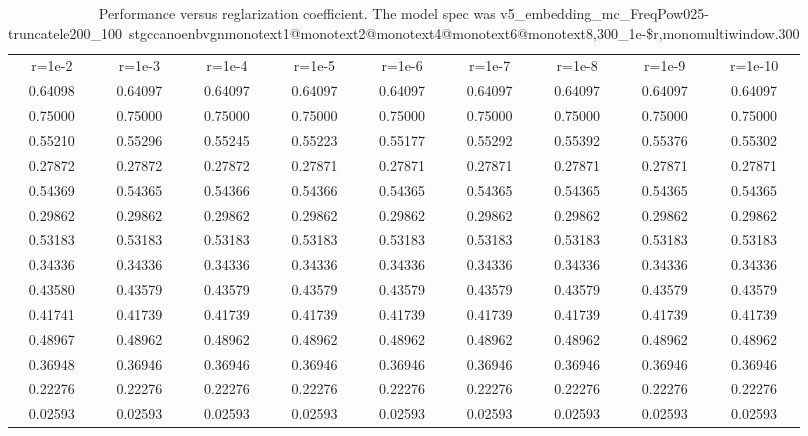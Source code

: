\documentclass[11pt]{article}
\begin{document}
\begin{table*}[htbp]
  \centering
  \begin{tabular}{ccccccccc}
    r=1e-2 & r=1e-3 & r=1e-4 & r=1e-5 & r=1e-6 & r=1e-7 & r=1e-8 & r=1e-9 & r=1e-10 \\
0.64098 & 0.64097 & 0.64097 & 0.64097 & 0.64097 & 0.64097 & 0.64097 & 0.64097 & 0.64097 \\
0.75000 & 0.75000 & 0.75000 & 0.75000 & 0.75000 & 0.75000 & 0.75000 & 0.75000 & 0.75000 \\
0.55210 & 0.55296 & 0.55245 & 0.55223 & 0.55177 & 0.55292 & 0.55392 & 0.55376 & 0.55302  \\
0.27872 & 0.27872 & 0.27872 & 0.27871 & 0.27871 & 0.27871 & 0.27871 & 0.27871 & 0.27871  \\
0.54369 & 0.54365 & 0.54366 & 0.54366 & 0.54365 & 0.54365 & 0.54365 & 0.54365 & 0.54365  \\
0.29862 & 0.29862 & 0.29862 & 0.29862 & 0.29862 & 0.29862 & 0.29862 & 0.29862 & 0.29862  \\
0.53183 & 0.53183 & 0.53183 & 0.53183 & 0.53183 & 0.53183 & 0.53183 & 0.53183 & 0.53183  \\
0.34336 & 0.34336 & 0.34336 & 0.34336 & 0.34336 & 0.34336 & 0.34336 & 0.34336 & 0.34336  \\
0.43580 & 0.43579 & 0.43579 & 0.43579 & 0.43579 & 0.43579 & 0.43579 & 0.43579 & 0.43579  \\
0.41741 & 0.41739 & 0.41739 & 0.41739 & 0.41739 & 0.41739 & 0.41739 & 0.41739 & 0.41739  \\
0.48967 & 0.48962 & 0.48962 & 0.48962 & 0.48962 & 0.48962 & 0.48962 & 0.48962 & 0.48962  \\
0.36948 & 0.36946 & 0.36946 & 0.36946 & 0.36946 & 0.36946 & 0.36946 & 0.36946 & 0.36946  \\
0.22276 & 0.22276 & 0.22276 & 0.22276 & 0.22276 & 0.22276 & 0.22276 & 0.22276 & 0.22276  \\
0.02593 & 0.02593 & 0.02593 & 0.02593 & 0.02593 & 0.02593 & 0.02593 & 0.02593 & 0.02593 \\
  \end{tabular}
  \caption{Performance versus reglarization coefficient. The model spec was v5\_embedding\_mc\_FreqPow025-truncatele200\_100~stgccanoenbvgnmonotext1@monotext2@monotext4@monotext6@monotext8,300\_1e-\$r,monomultiwindow.300 }
  \label{tab:r}
\end{table*}
\end{document}
